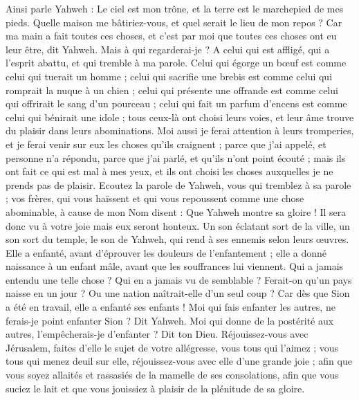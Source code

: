\begin{multicols}{2}
\VerseOne{}Ainsi parle Yahweh : Le ciel est mon trône, et la terre est le marchepied de mes pieds. Quelle maison me bâtiriez-vous, et quel serait le lieu de mon repos ?
Car ma main a fait toutes ces choses, et c'est par moi que toutes ces choses ont eu leur être, dit Yahweh. Mais à qui regarderai-je ? A celui qui est affligé, qui a l'esprit abattu, et qui tremble à ma parole.
Celui qui égorge un bœuf est comme celui qui tuerait un homme ; celui qui sacrifie une brebis est comme celui qui romprait la nuque à un chien ; celui qui présente une offrande est comme celui qui offrirait le sang d'un pourceau ; celui qui fait un parfum d'encens est comme celui qui bénirait une idole ; tous ceux-là ont choisi leurs voies, et leur âme trouve du plaisir dans leurs abominations.
Moi aussi je ferai attention à leurs tromperies, et je ferai venir sur eux les choses qu'ils craignent ; parce que j'ai appelé, et personne n'a répondu, parce que j'ai parlé, et qu'ils n'ont point écouté ; mais ils ont fait ce qui est mal à mes yeux, et ils ont choisi les choses auxquelles je ne prends pas de plaisir. 
Ecoutez la parole de Yahweh, vous qui tremblez à sa parole ; vos frères, qui vous haïssent et qui vous repoussent comme une chose abominable, à cause de mon Nom disent : Que Yahweh montre sa gloire ! Il sera donc vu à votre joie mais eux seront honteux. 
Un son éclatant sort de la ville, un son sort du temple, le son de Yahweh, qui rend à ses ennemis selon leurs œuvres.
Elle a enfanté, avant d'éprouver les douleurs de l'enfantement ; elle a donné naissance à un enfant mâle, avant que les souffrances lui viennent.
Qui a jamais entendu une telle chose ? Qui en a jamais vu de semblable ? Ferait-on qu'un pays naisse en un jour ? Ou une nation naîtrait-elle d'un seul coup ? Car dès que Sion a été en travail, elle a enfanté ses enfants !
Moi qui fais enfanter les autres, ne ferais-je point enfanter Sion ? Dit Yahweh. Moi qui donne de la postérité aux autres, l'empêcherais-je d'enfanter ? Dit ton Dieu.
Réjouissez-vous avec Jérusalem, faites d'elle le sujet de votre allégresse, vous tous qui l'aimez ; vous tous qui menez deuil sur elle, réjouissez-vous avec elle d'une grande joie ;
afin que vous soyez allaités et rassasiés de la mamelle de ses consolations, afin que vous suciez le lait et que vous jouissiez à plaisir de la plénitude de sa gloire.

\end{multicols}
